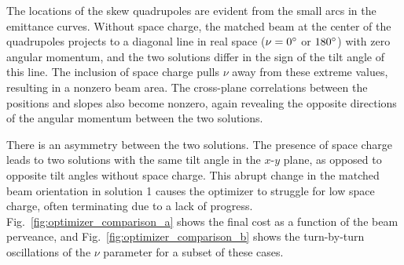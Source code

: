 %
The locations of the skew quadrupoles are evident from the small arcs in the emittance curves. Without space charge, the matched beam at the center of the quadrupoles projects to a diagonal line in real space ($\nu = 0\degree$ or $180\degree$) with zero angular momentum, and the two solutions differ in the sign of the tilt angle of this line. The inclusion of space charge pulls $\nu$ away from these extreme values, resulting in a nonzero beam area. The cross-plane correlations between the positions and slopes also become nonzero, again revealing the opposite directions of the angular momentum between the two solutions. 

There is an asymmetry between the two solutions. The presence of space charge leads to two solutions with the same tilt angle in the $x$-$y$ plane, as opposed to opposite tilt angles without space charge. This abrupt change in the matched beam orientation in solution 1 causes the optimizer to struggle for low space charge, often terminating due to a lack of progress. Fig.~\ref{fig:optimizer_comparison_a} shows the final cost as a function of the beam perveance, and Fig.~\ref{fig:optimizer_comparison_b} shows the turn-by-turn oscillations of the $\nu$ parameter for a subset of these cases. 
%

